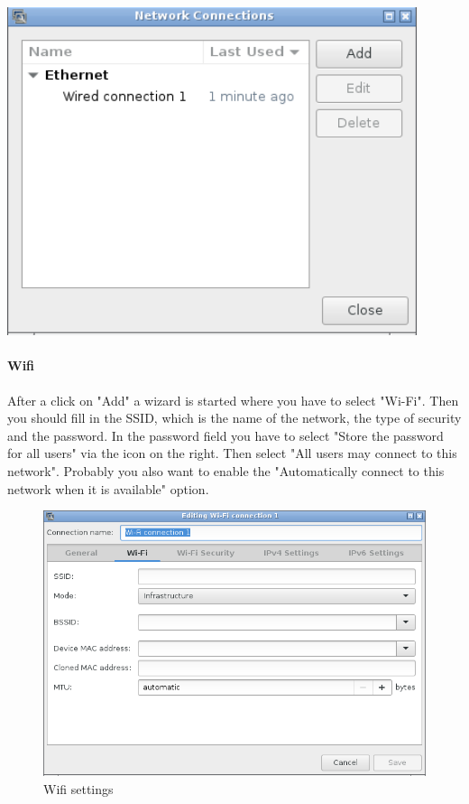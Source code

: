 \documentclass[a4paper,12pt,twoside]{article}
\begin{document}
\bigskip
\begin{minipage}{\linewidth}
    \centering
    \captionsetup{type=figure}
    \includegraphics[width=12cm]{screenshots/network_manager.png}
    \label{fig:dialog_network}
\end{minipage}


\paragraph{Wifi}
\label{sct:wifi}
After a click on "Add" a wizard is started where you have to select
"Wi-Fi". Then you should
fill in the SSID, which is the name of the network, the type of
security and the password. In the password field you have to select
"Store the password for all users" via the icon on the right. Then 
select "All users may connect to this network". Probably you also 
want to enable the "Automatically connect to this network when it 
is available" option.

\begin{figure}
    \centering
    \includegraphics[width=13cm]{screenshots/network_manager_wifi.png}
    \caption{Wifi settings}
    \label{fig:wifi}
\end{figure}
\end{document}
